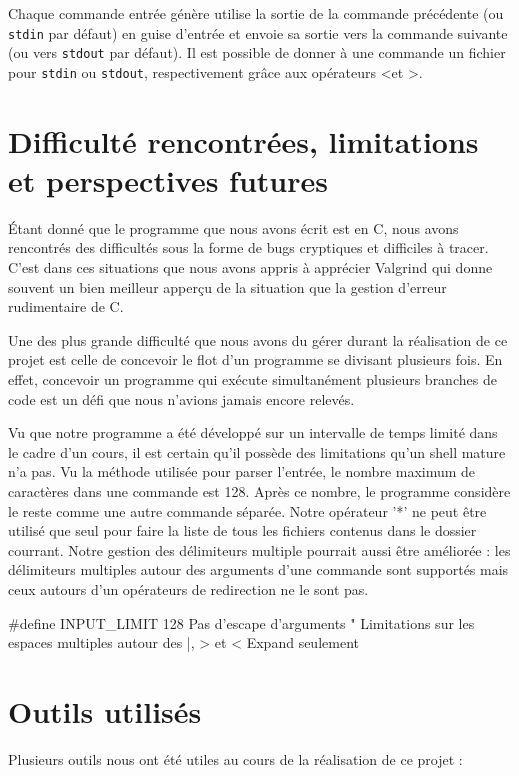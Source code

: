 \documentclass{article}
\begin{document}
Chaque commande entrée génère utilise la sortie de la commande précédente (ou \texttt{stdin} par défaut) en guise d'entrée et envoie sa sortie vers la commande suivante (ou vers \texttt{stdout} par défaut). Il est possible de donner à une commande un fichier pour \texttt{stdin} ou \texttt{stdout}, respectivement grâce aux opérateurs \textless et \textgreater.

\section{Difficulté rencontrées, limitations et perspectives futures}
Étant donné que le programme que nous avons écrit est en C, nous avons rencontrés des difficultés sous la forme de bugs cryptiques et difficiles à tracer. C'est dans ces situations que nous avons appris à apprécier Valgrind qui donne souvent un bien meilleur apperçu de la situation que la gestion d'erreur rudimentaire de C. 

Une des plus grande difficulté que nous avons du gérer durant la réalisation de ce projet est celle de concevoir le flot d'un programme se divisant plusieurs fois. En effet, concevoir un programme qui exécute simultanément plusieurs branches de code est un défi que nous n'avions jamais encore relevés. 

Vu que notre programme a été développé sur un intervalle de temps limité dans le cadre d'un cours, il est certain qu'il possède des limitations qu'un shell mature n'a pas. Vu la méthode utilisée pour parser l'entrée, le nombre maximum de caractères dans une commande est 128. Après ce nombre, le programme considère le reste comme une autre commande séparée. Notre opérateur '*' ne peut être utilisé que seul pour faire la liste de tous les fichiers contenus dans le dossier courrant. Notre gestion des délimiteurs multiple pourrait aussi être améliorée : les délimiteurs multiples autour des arguments d'une commande sont supportés mais ceux autours d'un opérateurs de redirection ne le sont pas.



\#define INPUT\_LIMIT 128
Pas d'escape d'arguments "
Limitations sur les espaces multiples autour des |, > et <
Expand seulement

\newpage

\section{Outils utilisés}

Plusieurs outils nous ont été utiles au cours de la réalisation de ce projet : 
\end{document}
